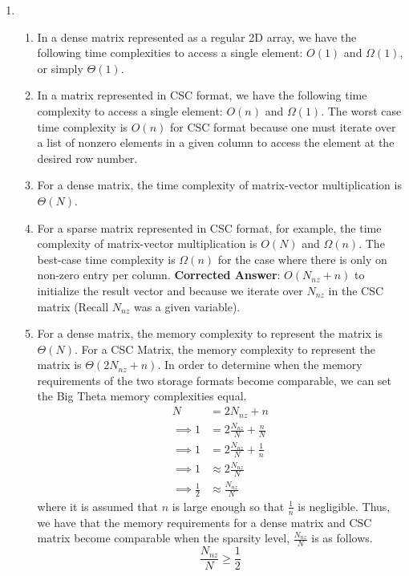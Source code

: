 \documentclass[11pt]{article}
\begin{document}
\begin{enumerate}[leftmargin=0.9in]
\item %
   \begin{enumerate}[leftmargin=0.3in]
      \item
        In a dense matrix represented as a regular 2D array, we have the following time complexities to access a single element: $O(1)$ and $\Omega(1)$, or simply $\Theta(1)$.
      \item
         In a matrix represented in CSC format, we have the following time complexity to access a single element: $O(n)$ and $\Omega(1)$. The worst case time complexity is $O(n)$ for CSC format because one must iterate over a list of nonzero elements in a given column to access the element at the desired row number.
      \item
        For a dense matrix, the time complexity of matrix-vector multiplication is $\Theta(N)$.
      \item
        For a sparse matrix represented in CSC format, for example, the time complexity of matrix-vector multiplication is $O(N)$ and $\Omega(n)$. The best-case time complexity is $\Omega(n)$ for the case where there is only on non-zero entry per column. \newline \textbf{Corrected Answer}: $O(N_{nz} + n)$ to initialize the result vector and because we iterate over $N_{nz}$ in the CSC matrix (Recall $N_{nz}$ was a given variable).
      \item
        For a dense matrix, the memory complexity to represent the matrix is $\Theta(N)$. For a CSC Matrix, the memory complexity to represent the matrix is $\Theta(2N_{nz} + n)$. In order to determine when the memory requirements of the two storage formats become comparable, we can set the Big Theta memory complexities equal.
        \begin{align*}
          N &= 2N_{nz} + n \\
          \implies 1 &= 2\frac{N_{nz}}{N} + \frac{n}{N} \\        
          \implies 1 &= 2\frac{N_{nz}}{N} + \frac{1}{n} \\        
          \implies 1 &\approx 2\frac{N_{nz}}{N} \\
          \implies \frac{1}{2} &\approx \frac{N_{nz}}{N}
        \end{align*}
        where it is assumed that $n$ is large enough so that $\frac{1}{n}$ is negligible.
        Thus, we have that the memory requirements for a dense matrix and CSC matrix become comparable when the sparsity level, $\frac{N_{nz}}{N}$ is as follows.
        \begin{equation}
          \frac{N_{nz}}{N} \geq \frac{1}{2}
        \end{equation}

   \end{enumerate}

\end{enumerate} %
\end{document}
